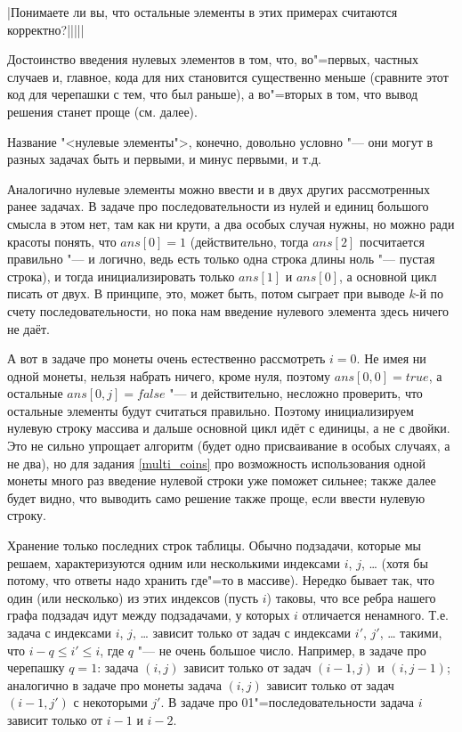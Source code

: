 |Понимаете ли вы, что остальные элементы в этих примерах считаются корректно?|||||

Достоинство введения нулевых элементов в том, что, во"=первых, частных случаев и, главное, кода для них становится существенно меньше (сравните этот код для черепашки с тем, что был раньше), а во"=вторых в том, что вывод решения станет проще (см. далее).

Название "<нулевые элементы">, конечно, довольно условно "--- они могут в разных задачах быть и 
первыми, и минус первыми, и т.д.

Аналогично нулевые элементы можно ввести и в двух других рассмотренных ранее задачах. В задаче про последовательности из нулей и единиц большого смысла в этом нет, там как ни крути, а два особых случая нужны, но можно ради красоты понять, что $ans[0]=1$ (действительно, тогда $ans[2]$ посчитается правильно "--- и логично, ведь есть только одна строка длины ноль "--- пустая строка), и тогда инициализировать только $ans[1]$ и $ans[0]$, а основной цикл писать от двух. В принципе, это, может быть, потом сыграет при выводе $k$-й по счету последовательности, но пока нам введение нулевого элемента здесь ничего не даёт.

А вот в задаче про монеты очень естественно рассмотреть $i=0$. Не имея ни одной монеты, нельзя набрать ничего, кроме нуля, поэтому $ans[0,0]=true$, а остальные $ans[0,j]=false$ "--- и действительно, несложно проверить, что остальные элементы будут считаться правильно. Поэтому инициализируем нулевую строку массива и дальше основной цикл идёт с единицы, а не с двойки. Это не сильно упрощает алгоритм (будет одно присваивание в особых случаях, а не два), но для задания \ref{multi_coins} про возможность использования одной монеты много раз введение нулевой строки уже поможет сильнее; также далее будет видно, что выводить само решение также проще, если ввести нулевую строку.

\llheader Хранение только последних строк таблицы. Обычно подзадачи, которые мы решаем, характеризуются одним или несколькими
индексами $i$, $j$, \dots{} (хотя бы потому, что ответы надо хранить где"=то в массиве). Нередко бывает так, что один (или
несколько) из этих индексов (пусть $i$) таковы, что все ребра нашего графа подзадач идут между подзадачами, у которых
$i$ отличается ненамного. Т.е. задача с индексами $i$, $j$, \dots{} зависит только от задач с индексами $i'$, $j'$, \dots{}
такими, что $i-q\leq i'\leq i$, где $q$ "--- не очень большое число. Например, в задаче про черепашку $q=1$: задача $(i,j)$
зависит только от задач $(i-1,j)$ и $(i,j-1)$; аналогично в задаче про монеты задача $(i,j)$ зависит только от задач $(i-1,j')$
с некоторыми $j'$. В задаче про 01"=последовательности задача $i$ зависит только от $i-1$ и $i-2$.

